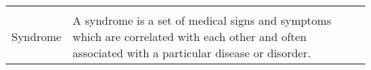 \documentclass[../report.tex]{subfiles}
\begin{document}
\begin{table}[H]
\begin{tabular}{ll}
			&                                                                                                                                                                                                                                                                                                                                                                                                            \\
			Syndrome            & A syndrome is a set of medical signs and symptoms which are correlated with each other and often associated with a particular disease or disorder.                                                                                                                                                                                                                                                        
		\end{tabular}
	\end{table}
\end{document}
